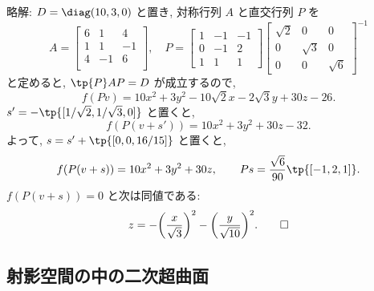 \documentclass[12pt,twoside]{jarticle}
\newcommand\commentout[1]{#1}
\newcommand\commentout[1]{}
\begin{document}
\commentout{
\medskip
\noindent
略解: $D=\diag(10,3,0)$ と置き, 対称行列 $A$ と直交行列 $P$ を
\begin{equation*}
  A =
  \left[ 
    \begin{array}{rrr}
      6 &  1 &  4 \\
      1 &  1 & -1 \\
      4 & -1 &  6 \\
    \end{array}
  \right],
  \quad
  P = 
  \left[ 
    \begin{array}{rrr}
      1 & -1 & -1 \\
      0 & -1 &  2 \\
      1 &  1 &  1
    \end{array}
  \right]
  \left[ 
    \begin{array}{ccc}
      \sqrt {2} & 0 & 0 \\
      0 & \sqrt {3} & 0 \\
      0 & 0 & \sqrt {6}
    \end{array}
  \right]^{-1}
\end{equation*}
と定めると, $\tp{P}AP=D$ が成立するので,
\begin{equation*}
  f(Pv) = 10x^2 + 3y^2 - 10\sqrt{2}x - 2\sqrt{3}y + 30z - 26.
\end{equation*}
$s'=-\tp{[1/\sqrt{2},1/\sqrt{3},0]}$ と置くと,
\begin{equation*}
  f(P(v+s')) = 10x^2 + 3y^2 + 30z - 32.
\end{equation*}
よって, $s = s' + \tp{[0,0,16/15]}$ と置くと,
\begin{equation*}
  f(P(v+s)) = 10x^2 + 3y^2 + 30z,
  \qquad
  Ps = \frac{\sqrt{6}}{90}\tp{[-1,2,1]}.
\end{equation*}
$f(P(v+s))=0$ と次は同値である:
\begin{equation*}
  z = 
  - \bigg(\frac{x}{\sqrt{3}}\bigg)^2 
  - \bigg(\frac{y}{\sqrt{10}}\bigg)^2.
  \qed
\end{equation*}
}


\subsection{射影空間の中の二次超曲面}
\label{sec:projective-quadratic}

\end{document}
